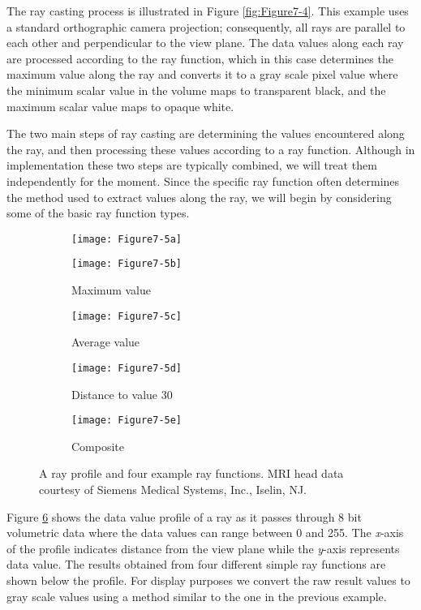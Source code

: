 The ray casting process is illustrated in Figure \ref{fig:Figure7-4}. This example uses a standard orthographic camera projection; consequently, all rays are parallel to each other and perpendicular to the view plane. The data values along each ray are processed according to the ray function, which in this case determines the maximum value along the ray and converts it to a gray scale pixel value where the minimum scalar value in the volume maps to transparent black, and the maximum scalar value maps to opaque white.

The two main steps of ray casting are determining the values encountered along the ray, and then processing these values according to a ray function. Although in implementation these two steps are typically combined, we will treat them independently for the moment. Since the specific ray function often determines the method used to extract values along the ray, we will begin by considering some of the basic ray function types.

\begin{figure}[!htb]
	\begin{subfigure}[h]{0.96\linewidth}
		\texttt{[image: Figure7-5a]}
		\caption*{}\label{fig:Figure7-5a}
	\end{subfigure}
	\hfill
	\begin{subfigure}[h]{0.48\linewidth}
		\texttt{[image: Figure7-5b]}
		\caption*{Maximum value}\label{fig:Figure7-5b}
	\end{subfigure}%
	\hfill
	\begin{subfigure}[h]{0.48\linewidth}
		\texttt{[image: Figure7-5c]}
		\caption*{Average value}\label{fig:Figure7-5c}
	\end{subfigure}
	\hfill
	\begin{subfigure}[h]{0.48\linewidth}
		\texttt{[image: Figure7-5d]}
		\caption*{Distance to value 30}\label{fig:Figure7-5d}
	\end{subfigure}%
	\hfill
	\begin{subfigure}[h]{0.48\linewidth}
		\texttt{[image: Figure7-5e]}
		\caption*{Composite}\label{fig:Figure7-5e}
	\end{subfigure}
	\caption{A ray profile and four example ray functions. MRI head data courtesy of Siemens Medical Systems, Inc., Iselin, NJ.}\label{fig:Figure7-5}
\end{figure}

Figure \ref{fig:Figure7-5} shows the data value profile of a ray as it passes through 8 bit volumetric data where the data values can range between 0 and 255. The \emph{x}-axis of the profile indicates distance from the view plane while the \emph{y}-axis represents data value. The results obtained from four different simple ray functions are shown below the profile. For display purposes we convert the raw result values to gray scale values using a method similar to the one in the previous example.

